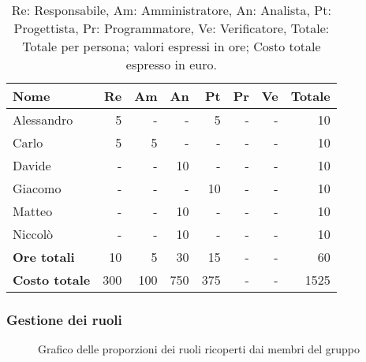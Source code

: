 \begin{table}[H]
	\centering
	\begin{tabular}{l|r|r|r|r|r|r|r}
		\textbf{Nome}         & \textbf{Re} & \textbf{Am} & \textbf{An} & \textbf{Pt} & \textbf{Pr} & \textbf{Ve} & \textbf{Totale} \\
		\hline
		Alessandro            & 5           & -           & -           & 5           & -           & -           & 10              \\
		Carlo                 & 5           & 5           & -           & -           & -           & -           & 10              \\
		Davide                & -           & -           & 10          & -           & -           & -           & 10              \\
		Giacomo               & -           & -           & -           & 10          & -           & -           & 10              \\
		Matteo                & -           & -           & 10          & -           & -           & -           & 10              \\
		Niccolò               & -           & -           & 10          & -           & -           & -           & 10              \\
		\hline
		\textbf{Ore totali}   & 10          & 5           & 30          & 15          & -           & -           & 60              \\
		\textbf{Costo totale} & 300         & 100         & 750         & 375         & -           & -           & 1525
	\end{tabular}
	\caption{Re: Responsabile, Am: Amministratore, An: Analista, Pt: Progettista,
		Pr: Programmatore, Ve: Verificatore, Totale: Totale per persona; valori espressi in ore; Costo totale espresso in euro.}
\end{table}

\newpage
\subsubsection{Gestione dei ruoli}

\begin{figure}[h]
	\centering
	\caption{Grafico delle proporzioni dei ruoli ricoperti dai membri del gruppo}
\end{figure}


